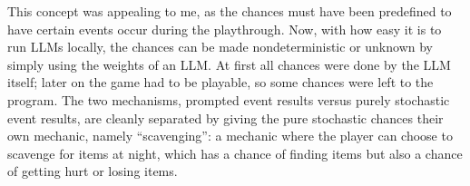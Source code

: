 \documentclass{article}
\begin{document}
This concept was appealing to me, as the chances must have been predefined to have
certain events occur during the playthrough.
Now, with how easy it is to run LLMs locally, the chances can be made nondeterministic or
unknown by simply using the weights of an LLM.
At first all chances were done by the LLM itself; later on the game had to be playable, so
some chances were left to the program.
The two mechanisms, prompted event results versus purely stochastic event
results, are cleanly separated by giving the pure stochastic chances their own mechanic,
namely ``scavenging'': a mechanic where the player can choose to scavenge for items at
night, which has a chance of finding items but also a chance of getting hurt or losing
items.



\end{document}
